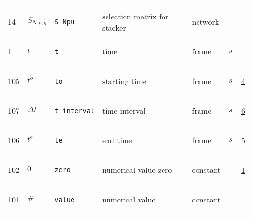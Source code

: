 \begin{longtable}{|p{1cm}|p{2.5cm}|p{4.5cm}|p{8cm}|p{3.0cm}|p{3cm}|p{1cm}|}
             & $  $
             & \\
            14
             & \hypertarget{"v:14"}{ $ {{S}}{_{N, p, q}} $}
             & \verb|S_Npu|
             & selection matrix for stacker
             & \begin{lay}network \end{lay}
             & $  $
             & \\
            1
             & \hypertarget{"v:1"}{ $ {t}{_{}} $}
             & \verb|t|
             & time
             & \begin{lay}frame \end{lay}
             & $ s \, $
             & \\
            105
             & \hypertarget{"v:105"}{ $ {{t^o}}{_{}} $}
             & \verb|to|
             & starting time
             & \begin{lay}frame \end{lay}
             & $ s \, $
             &                 \hyperlink{"e:4"}{ 4 }
                 \\
            107
             & \hypertarget{"v:107"}{ $ {{\Delta t}}{_{}} $}
             & \verb|t_interval|
             & time interval
             & \begin{lay}frame \end{lay}
             & $ s \, $
             &                 \hyperlink{"e:6"}{ 6 }
                 \\
            106
             & \hypertarget{"v:106"}{ $ {{t^e}}{_{}} $}
             & \verb|te|
             & end time
             & \begin{lay}frame \end{lay}
             & $ s \, $
             &                 \hyperlink{"e:5"}{ 5 }
                 \\
            102
             & \hypertarget{"v:102"}{ $ {0}{_{}} $}
             & \verb|zero|
             & numerical value zero
             & \begin{lay}constant \end{lay}
             & $  $
             &                 \hyperlink{"e:1"}{ 1 }
                 \\
            101
             & \hypertarget{"v:101"}{ $ {{\#}}{_{}} $}
             & \verb|value|
             & numerical value
             & \begin{lay}constant \end{lay}
             & $  $
             & \\

\end{longtable}
